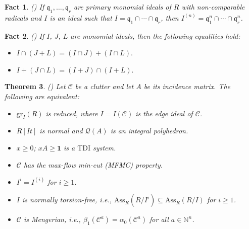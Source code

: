 \documentclass[11pt]{amsart}
\newtheorem{theorem}{Theorem}[section]
\newtheorem{fact}[theorem]{Fact}
\begin{document}
\begin{fact} \label{exercise 6.1.25} (\cite[Exercise 6.1.25]{V1})
 If $\mathfrak{q}_1, \ldots, \mathfrak{q}_r$  are primary monomial ideals of $R$ with non-comparable
radicals and $I$ is an ideal such that $I=\mathfrak{q}_1 \cap \cdots \cap  \mathfrak{q}_r$, then
$I^{(n)}=\mathfrak{q}^n_1 \cap \cdots \cap  \mathfrak{q}^n_r$. 
\end{fact}

 
\begin{fact} \label{fact1} (\cite[Exercise 6.1.23]{V1}) 
If $I$, $J$, $L$ are monomial ideals, then  the following equalities hold:
\begin{itemize}
\item[(i)]  $I\cap (J+L)=(I \cap J) + (I \cap L).$
\item[(ii)] $I+ (J \cap L)= (I+J) \cap (I+L).$
\end{itemize}
\end{fact}



\begin{theorem} (\cite[Theorem 14.3.6]{V1})  \label{Villarreal1}
 Let $\mathcal{C}$  be a clutter and let  $A$ be its incidence matrix. The following are equivalent:
 \begin{itemize}
 \item[(i)] $\mathrm{gr}_I(R)$ is reduced, where $I=I(\mathcal{C})$ is the edge ideal of $\mathcal{C}$. 
 \item[(ii)] $R[It]$ is normal  and $\mathcal{Q}(A)$ is an integral polyhedron. 
 \item[(iii)]  $x\geq 0$; $xA\geq \textbf{1}$   is a $\mathrm{TDI}$ system. 
 \item[(iv)]  $\mathcal{C}$  has the max-flow min-cut (MFMC) property.
 \item[(v)]  $I^i = I^{(i)}$ for $i \geq 1$. 
 \item[(vi)]  $I$ is normally torsion-free, i.e.,  $\mathrm{Ass}_R(R/I^i) \subseteq  \mathrm{Ass}_R(R/I)$ for $i\geq 1$. 
 \item[(vii)]  $\mathcal{C}$  is Mengerian, i.e., $\beta_1({\mathcal{C}}^a) = \alpha_0({\mathcal{C}}^a)$ for all  $a \in \mathbb{N}^n$.
 \end{itemize}
\end{theorem}
\end{document}
